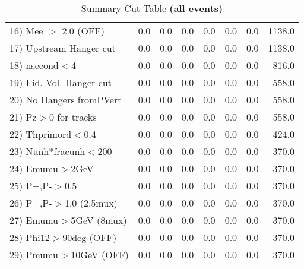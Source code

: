 \begin{table}[h!]
{{\begin{tabular}{||l||r|r|r|r|r||r||r||}
 16) Mee $>$ 2.0  (OFF)   &       0.0 &       0.0 &       0.0 &       0.0 &       0.0 &       0.0 &    1138.0 \\
 17) Upstream Hanger cut  &       0.0 &       0.0 &       0.0 &       0.0 &       0.0 &       0.0 &    1138.0 \\
 18) nsecond$<$4          &       0.0 &       0.0 &       0.0 &       0.0 &       0.0 &       0.0 &     816.0 \\
 19) Fid. Vol. Hanger cut &       0.0 &       0.0 &       0.0 &       0.0 &       0.0 &       0.0 &     558.0 \\
 20) No Hangers fromPVert &       0.0 &       0.0 &       0.0 &       0.0 &       0.0 &       0.0 &     558.0 \\
 21) Pz$>$0 for tracks    &       0.0 &       0.0 &       0.0 &       0.0 &       0.0 &       0.0 &     558.0 \\
 22) Thprimord$<$0.4      &       0.0 &       0.0 &       0.0 &       0.0 &       0.0 &       0.0 &     424.0 \\
 23) Nunh*fracunh$<$200   &       0.0 &       0.0 &       0.0 &       0.0 &       0.0 &       0.0 &     370.0 \\
 24) Emumu$>$2GeV         &       0.0 &       0.0 &       0.0 &       0.0 &       0.0 &       0.0 &     370.0 \\
 25) P+,P-$>$0.5          &       0.0 &       0.0 &       0.0 &       0.0 &       0.0 &       0.0 &     370.0 \\
 26) P+,P-$>$1.0 (2.5mux) &       0.0 &       0.0 &       0.0 &       0.0 &       0.0 &       0.0 &     370.0 \\
 27) Emumu$>$5GeV  (8mux) &       0.0 &       0.0 &       0.0 &       0.0 &       0.0 &       0.0 &     370.0 \\
 28) Phi12$>$90deg  (OFF) &       0.0 &       0.0 &       0.0 &       0.0 &       0.0 &       0.0 &     370.0 \\
 29) Pmumu$>$10GeV  (OFF) &       0.0 &       0.0 &       0.0 &       0.0 &       0.0 &       0.0 &     370.0 \\
 \hline
 \hline
 \end{tabular}
 \caption{Summary Cut Table \textbf{ (all events)}}
 \label{tab-sumcut}
 }}
 \end{table}
 \endinput
